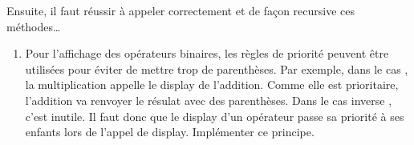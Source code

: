 \documentclass[letterpaper,10pt,english]{sphinxhowto}
\begin{document}
\sphinxAtStartPar
Ensuite, il faut réussir à appeler correctement et de façon recursive ces méthodes…
\begin{enumerate}
%
\setcounter{enumi}{9}
\item {} 
\sphinxAtStartPar
Pour l’affichage des opérateurs binaires, les règles de priorité peuvent être utilisées pour éviter de mettre trop de parenthèses. Par exemple, dans le cas , la multiplication appelle le display de l’addition. Comme elle est prioritaire, l’addition va renvoyer le résulat avec des parenthèses. Dans le cas inverse , c’est inutile. Il faut donc que le display d’un opérateur passe sa priorité à ses enfants lors de l’appel de display. Implémenter ce principe.

\end{enumerate}
\end{document}

